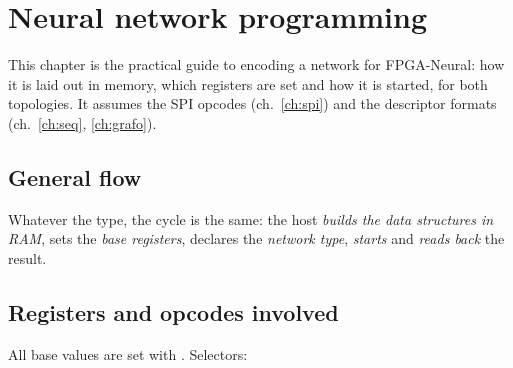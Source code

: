 \chapter[Network programming]{Neural network programming}
\label{ch:prog}

This chapter is the practical guide to encoding a network for FPGA-Neural: how it is laid
out in memory, which registers are set and how it is started, for both topologies. It
assumes the SPI opcodes (ch.~\ref{ch:spi}) and the descriptor formats (ch.~\ref{ch:seq},
\ref{ch:grafo}).

\section{General flow}
Whatever the type, the cycle is the same: the host \emph{builds the data structures in
RAM}, sets the \emph{base registers}, declares the \emph{network type}, \emph{starts} and
\emph{reads back} the result.

\begin{center}
\end{center}

\section{Registers and opcodes involved}
All base values are set with  . Selectors:

